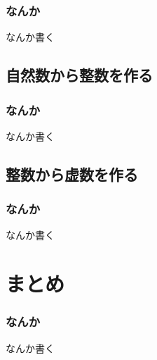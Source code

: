 \documentclass[dvipdfmx]{beamer}
\begin{document}
  \begin{frame}
    \frametitle{なんか}
  
    なんか書く
  
  \end{frame}

  \subsection{自然数から整数を作る}

  \begin{frame}
    \frametitle{なんか}
  
    なんか書く
  
  \end{frame}

  \subsection{整数から虚数を作る}

  \begin{frame}
    \frametitle{なんか}
  
    なんか書く
  
  \end{frame}

  \section{まとめ}

  \begin{frame}
    \frametitle{なんか}
  
    なんか書く
  
  \end{frame}
\end{document}
